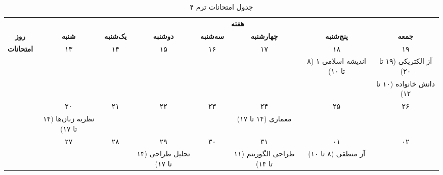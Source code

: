 \documentclass{article}
\begin{document}
	
	\begin{sidewaystable}[h]
		\begin{center}	
			\caption{جدول امتحانات ترم ۴}	
			\begin{tabular}{|c|c|c|c|c|c|c|c|}
				\cline{2-8}
				\multicolumn{1}{c}{} &
				\multicolumn{7}{|c|}{\textbf{هفته}} \\
				\cline{1-8}
				
				\multicolumn{1}{|c|}{\textbf{روز}} &
				\textbf{شنبه} &
				\textbf{یک‌شنبه} & 
				\textbf{دوشنبه} & 
				\textbf{سه‌شنبه} & 
				\textbf{چهارشنبه} & 
				\textbf{پنج‌شنبه} & 
				\textbf{جمعه} \\ 
				\hline \hline
				
				\multirow{7}{*}{\textbf{امتحانات}}
				& ۱۳ & ۱۴ & ۱۵ & ۱۶ & ۱۷ & ۱۸ & ۱۹ \\
				\cline{2-8}
				& & & & & & اندیشه اسلامی ۱ (۸ تا ۱۰) & آز الکتریکی (۱۹ تا ۲۰) \\
				\cline{2-8}				
				& & & & & & & دانش خانواده (۱۰ تا ۱۲) \\
				
				\cline{2-8}				
				& ۲۰ & ۲۱ & ۲۲ & ۲۳ & ۲۴ & ۲۵ & ۲۶ \\
				\cline{2-8}
				& نظریه زبان‌ها (۱۴ تا ۱۷) & & & & معماری (۱۴ تا ۱۷) & & \\
				\cline{2-8}	\cline{2-8}			
				& ۲۷ & ۲۸ & ۲۹ & ۳۰ & ۳۱ & ۰۱ & ۰۲ \\
				\cline{2-8}
				& & & تحلیل طراحی (۱۴ تا ۱۷) & & طراحی الگوریتم (۱۱ تا ۱۴) & آز منطقی (۸ تا ۱۰) & \\
				\hline
				
			\end{tabular}
		\end{center}
	\end{sidewaystable}
\end{document}
